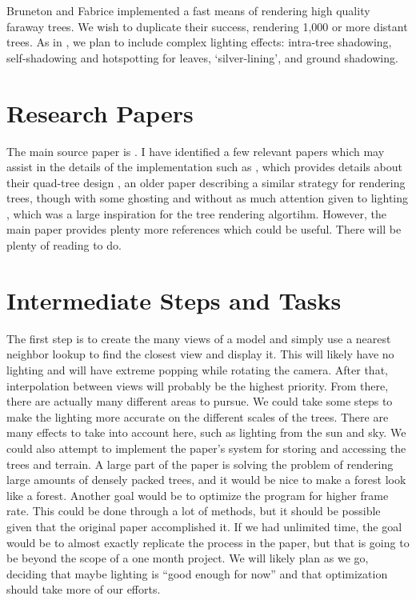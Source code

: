 \documentclass{article}
\begin{document}
Bruneton and Fabrice\cite{trees} implemented a fast means of rendering high quality faraway trees.  We wish to duplicate their success, rendering 1,000 or more distant trees.  As in \cite{trees}, we plan to include complex lighting effects: intra-tree shadowing, self-shadowing and hotspotting for leaves, ‘silver-lining’, and ground shadowing.

\section{Research Papers}
The main source paper is \cite{trees}. I have identified a few relevant papers which may assist in the details of the implementation such as 
\cite{vecterrain}, which provides details about their quad-tree design \cite{treeszbuf}, an older paper describing a similar strategy for rendering trees, though with some ghosting and without as much attention given to lighting \cite{fastlightfield}, which was a large inspiration for the tree rendering algortihm.  However, the main paper provides plenty more references which could be useful. There will be plenty of reading to do.

\section{Intermediate Steps and Tasks}
The first step is to create the many views of a model and simply use a nearest neighbor lookup to find the closest view and display it. This will likely have no lighting and will have extreme popping while rotating the camera. 
After that, interpolation between views will probably be the highest priority. 
From there, there are actually many different areas to pursue. We could take some steps to make the lighting more accurate on the different scales of the trees. There are many effects to take into account here, such as lighting from the sun and sky. 
We could also attempt to implement the paper's system for storing and accessing the trees and terrain. A large part of the paper is solving the problem of rendering large amounts of densely packed trees, and it would be nice to make a forest look like a forest. 
Another goal would be to optimize the program for higher frame rate. This could be done through a lot of methods, but it should be possible given that the original paper accomplished it. 
If we had unlimited time, the goal would be to almost exactly replicate the process in the paper, but that is going to be beyond the scope of a one month project. We will likely plan as we go, deciding that maybe lighting is ``good enough for now'' and that optimization should take more of our efforts.
\end{document}
